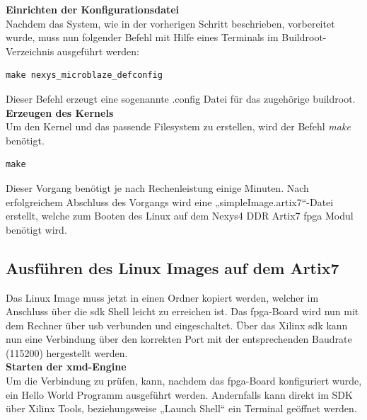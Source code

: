 \textbf{Einrichten der Konfigurationsdatei}\\

Nachdem das System, wie in der vorherigen Schritt beschrieben,
vorbereitet wurde, muss nun folgender Befehl mit Hilfe eines Terminals im Buildroot-Verzeichnis ausgeführt werden:\\

\begin{lstlisting}[caption={Generierung der \emph{defconf}-Datei},label={code:mbdefconf}]
  make nexys_microblaze_defconfig
 \end{lstlisting}


Dieser Befehl erzeugt eine sogenannte .config Datei für das zugehörige buildroot.\\

\textbf{Erzeugen des Kernels}\\

Um den Kernel und das passende Filesystem zu erstellen, wird der Befehl \emph{make} benötigt.\\

\begin{lstlisting}[caption={Erstellung des Kernels},label={code:mbkernel}]
  make
   \end{lstlisting}

Dieser Vorgang benötigt je nach Rechenleistung einige Minuten.
Nach erfolgreichem Abschluss des Vorgangs wird eine „simpleImage.artix7“-Datei erstellt,
welche zum Booten des Linux auf dem Nexys4 DDR Artix7 \ac{fpga} Modul benötigt wird.

\subsection{Ausführen des Linux Images auf dem Artix7}\label{kap:mcausführenlinux}



Das Linux Image muss jetzt in einen Ordner kopiert werden, welcher im Anschluss über
die \ac{sdk} Shell leicht zu erreichen ist. Das \ac{fpga}-Board wird nun mit dem Rechner über \ac{usb} verbunden und eingeschaltet.
 Über das Xilinx \ac{sdk} kann nun eine Verbindung über den korrekten Port mit der entsprechenden Baudrate (115200)
 hergestellt werden.\\

\textbf{Starten der \ac{xmd}-Engine}\\

Um die Verbindung zu prüfen, kann, nachdem das \ac{fpga}-Board konfiguriert wurde, ein Hello World Programm ausgeführt werden. Andernfalls kann direkt im SDK über Xilinx Tools, beziehungsweise  „Launch Shell“ ein Terminal geöffnet werden.\\

